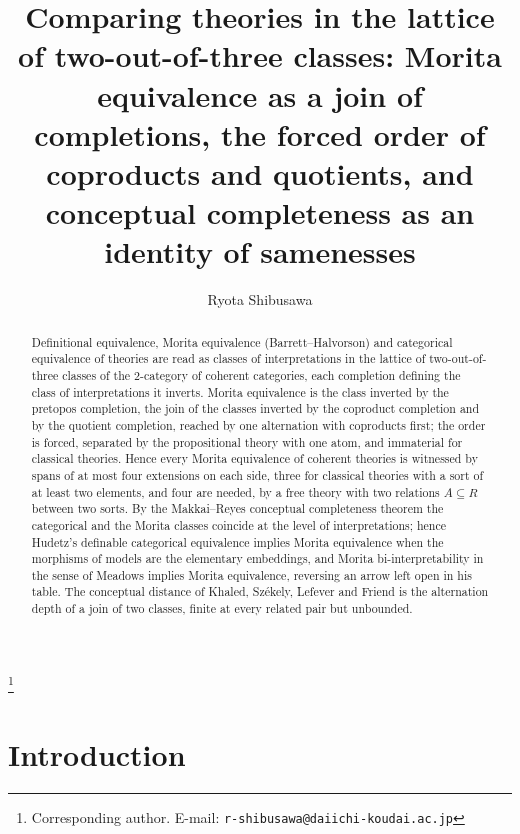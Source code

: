 \documentclass[11pt]{amsart}
\theoremstyle{definition}
\begin{document}
\title[Comparing theories in the sameness lattice]{Comparing theories in the lattice of two-out-of-three classes: Morita equivalence as a join of completions, the forced order of coproducts and quotients, and conceptual completeness as an identity of samenesses}
\author{Ryota Shibusawa}
\thanks{Corresponding author. E-mail: \texttt{r-shibusawa@daiichi-koudai.ac.jp}}
\address{Daiichi Institute of Technology}

\begin{abstract}
Definitional equivalence, Morita equivalence (Barrett--Halvorson) and
categorical equivalence of theories are read as classes of
interpretations in the lattice of two-out-of-three classes of the
$2$-category of coherent categories, each completion defining the class
of interpretations it inverts. Morita equivalence is
the class inverted by the pretopos completion, the join of the classes
inverted by the coproduct completion and by the quotient completion,
reached by one alternation with coproducts first; the order is forced,
separated by the propositional theory with one atom, and immaterial for
classical theories. Hence every Morita
equivalence of coherent theories is witnessed by spans of at most four
extensions on each side, three for classical theories with a sort of at
least two elements, and four are needed, by a free theory with two
relations $A\subseteq R$ between two sorts. By the Makkai--Reyes
conceptual completeness theorem the categorical and the Morita classes
coincide at the level of interpretations; hence Hudetz's definable
categorical equivalence implies Morita equivalence when the morphisms
of models are the elementary embeddings, and Morita bi-interpretability
in the sense of Meadows implies Morita equivalence, reversing an arrow
left open in his table. The conceptual distance of
Khaled, Sz\'ekely, Lefever and Friend is the alternation depth of a
join of two classes, finite at every related pair but unbounded.
\end{abstract}

\maketitle

\section{Introduction}
\end{document}
